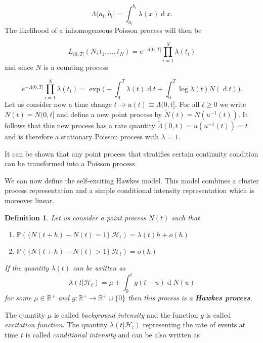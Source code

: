 \documentclass[11pt,a4paper]{article}
\renewcommand{\d}[1]{\ensuremath{\operatorname{d}\!{#1}}}
\newtheorem{definition}{Definition}[section]
\begin{document}
\begin{equation*}
    \Lambda(a_i, b_i] = \int_{a_i}^{b_i} \lambda(x) \d x.
\end{equation*}
The likelihood of a inhomogeneous Poisson process will then be

\begin{equation} \label{eq:LikInhPoiPro}
    L_{(0, T]}(N;t_1, \dots, t_N) = e^{-\Lambda(0, T]}\prod_{i=1}^N \lambda(t_i)
\end{equation}
and since $N$ is a counting process

\begin{equation*}
    e^{-\Lambda(0, T]}\prod_{i=1}^N \lambda(t_i) = \exp \Bigg( - \int_0^T \lambda(t)\d t + \int_0^T \log \lambda(t) N (\d t) \Bigg).
\end{equation*}
Let us consider now  a time change $t \rightarrow u(t) \equiv \Lambda(0, t]$. For all $t \geq 0$ we write $N(t) = N (0, t]$ and define a new point process by $\tilde{N}(t) = N(u^{-1}(t))$. It follows that this new process has a rate quantity $\tilde{\Lambda}(0, t) = u(u^{-1}(t)) = t$ and is therefore a stationary Poisson process with $\lambda = 1$.

It can be shown that any point process that stratifies certain continuity condition can be transformed into a Poisson  process. 

We can now define the self-exciting Hawkes model. This model combines a cluster process representation and a simple conditional intensity representation which is moreover linear.

\begin{definition}\label{def:Hawkes}
    Let us consider a point process $N(t)$ such that
    \begin{enumerate}[label=(\roman*)]
        \item $\mathbb{P}(\{ N(t+h) - N(t) = 1 \} | \mathcal{H}_t) = \lambda(t)h + o(h)$
        \item $\mathbb{P}(\{ N(t+h) - N(t) > 1 \} | \mathcal{H}_t) = o(h)$
    \end{enumerate}
    If the quantity $\lambda(t)$ can be written as
    \begin{equation*}
        \lambda(t | \mathcal{H}_t) = \mu + \int_{0}^t g(t - u) \d N(u)
    \end{equation*}
    for some $\mu \in \mathbb{R^+}$ and $g : \mathbb{R^+} \rightarrow \mathbb{R^+} \cup \{0\}$ then this process is a \textbf{Hawkes process}.
\end{definition}
The quantity $\mu$ is called \textit{background intensity} and the function $g$ is called \textit{excitation function}. The quantity $\lambda(t | \mathcal{H}_t)$ representing the rate of events at time $t$ is called \textit{conditional intensity} and can be also written as
\end{document}
